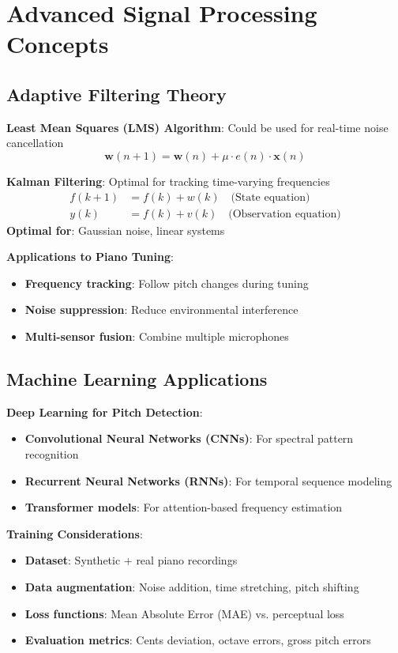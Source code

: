 \documentclass[11pt,a4paper]{article}
\begin{document}
\section{Advanced Signal Processing Concepts}

\subsection{Adaptive Filtering Theory}

\textbf{Least Mean Squares (LMS) Algorithm}: Could be used for real-time noise cancellation
\begin{equation}
\mathbf{w}(n+1) = \mathbf{w}(n) + \mu \cdot e(n) \cdot \mathbf{x}(n)
\end{equation}

\textbf{Kalman Filtering}: Optimal for tracking time-varying frequencies
\begin{align}
f(k+1) &= f(k) + w(k) \quad \text{(State equation)} \\
y(k) &= f(k) + v(k) \quad \text{(Observation equation)}
\end{align}
\textbf{Optimal for}: Gaussian noise, linear systems

\textbf{Applications to Piano Tuning}:
\begin{itemize}
    \item \textbf{Frequency tracking}: Follow pitch changes during tuning
    \item \textbf{Noise suppression}: Reduce environmental interference
    \item \textbf{Multi-sensor fusion}: Combine multiple microphones
\end{itemize}

\subsection{Machine Learning Applications}

\textbf{Deep Learning for Pitch Detection}:
\begin{itemize}
    \item \textbf{Convolutional Neural Networks (CNNs)}: For spectral pattern recognition
    \item \textbf{Recurrent Neural Networks (RNNs)}: For temporal sequence modeling
    \item \textbf{Transformer models}: For attention-based frequency estimation
\end{itemize}

\textbf{Training Considerations}:
\begin{itemize}
    \item \textbf{Dataset}: Synthetic + real piano recordings
    \item \textbf{Data augmentation}: Noise addition, time stretching, pitch shifting
    \item \textbf{Loss functions}: Mean Absolute Error (MAE) vs. perceptual loss
    \item \textbf{Evaluation metrics}: Cents deviation, octave errors, gross pitch errors
\end{itemize}
\end{document}

